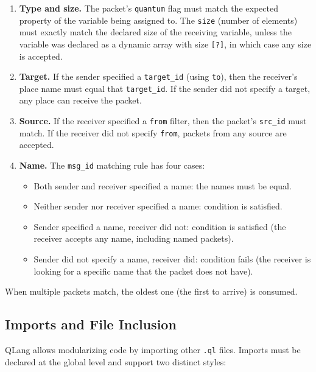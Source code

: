 \begin{enumerate}
    \item \textbf{Type and size.} The packet's \texttt{quantum} flag
    must match the expected property of the variable being assigned to. The \texttt{size} (number of elements) must exactly match the declared size of the receiving variable, unless the variable was declared as a dynamic array with size \texttt{[?]}, in which case any size is accepted.
    \item \textbf{Target.} If the sender specified a \texttt{target\_id} (using
        \texttt{to}), then the receiver's place name must equal that
        \texttt{target\_id}. If the sender did not specify a target, any place
        can receive the packet.
    \item \textbf{Source.} If the receiver specified a \texttt{from} filter,
        then the packet's \texttt{src\_id} must match. If the receiver did
        not specify \texttt{from}, packets from any source are accepted.
    \item \textbf{Name.} The \texttt{msg\_id} matching rule has four cases:
    \begin{itemize}
        \item Both sender and receiver specified a name: the names must be
            equal.
        \item Neither sender nor receiver specified a name: condition is
            satisfied.
        \item Sender specified a name, receiver did not: condition is
            satisfied (the receiver accepts any name, including named packets).
        \item Sender did not specify a name, receiver did: condition
            fails (the receiver is looking for a specific name that
            the packet does not have).
    \end{itemize}
\end{enumerate}

When multiple packets match, the oldest one (the first to arrive) is consumed.



\subsection{Imports and File Inclusion}\label{sec:imports}

QLang allows modularizing code by importing other \texttt{.ql} files. Imports must be declared at the global level and support two distinct styles:

